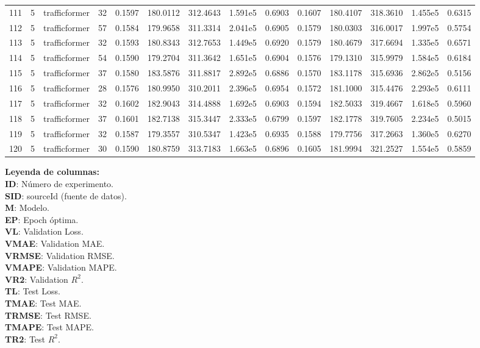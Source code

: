 \begin{landscape}
\begin{longtable}{c | c | c | c | c | c | c | c | c | c | c | c | c | c}
	111 & 5 & trafficformer & 32 & 0.1597 & 180.0112 & 312.4643 & 1.591e5 & 0.6903 & 0.1607 & 180.4107 & 318.3610 & 1.455e5 & 0.6315 \\
	112 & 5 & trafficformer & 57 & 0.1584 & 179.9658 & 311.3314 & 2.041e5 & 0.6905 & 0.1579 & 180.0303 & 316.0017 & 1.997e5 & 0.5754 \\
	113 & 5 & trafficformer & 32 & 0.1593 & 180.8343 & 312.7653 & 1.449e5 & 0.6920 & 0.1579 & 180.4679 & 317.6694 & 1.335e5 & 0.6571 \\
	114 & 5 & trafficformer & 54 & 0.1590 & 179.2704 & 311.3642 & 1.651e5 & 0.6904 & 0.1576 & 179.1310 & 315.9979 & 1.584e5 & 0.6184 \\
	115 & 5 & trafficformer & 37 & 0.1580 & 183.5876 & 311.8817 & 2.892e5 & 0.6886 & 0.1570 & 183.1178 & 315.6936 & 2.862e5 & 0.5156 \\
	116 & 5 & trafficformer & 28 & 0.1576 & 180.9950 & 310.2011 & 2.396e5 & 0.6954 & 0.1572 & 181.1000 & 315.4476 & 2.293e5 & 0.6111 \\
	117 & 5 & trafficformer & 32 & 0.1602 & 182.9043 & 314.4888 & 1.692e5 & 0.6903 & 0.1594 & 182.5033 & 319.4667 & 1.618e5 & 0.5960 \\
	118 & 5 & trafficformer & 37 & 0.1601 & 182.7138 & 315.3447 & 2.333e5 & 0.6799 & 0.1597 & 182.1778 & 319.7605 & 2.234e5 & 0.5015 \\
	119 & 5 & trafficformer & 32 & 0.1587 & 179.3557 & 310.5347 & 1.423e5 & 0.6935 & 0.1588 & 179.7756 & 317.2663 & 1.360e5 & 0.6270 \\
	120 & 5 & trafficformer & 30 & 0.1590 & 180.8759 & 313.7183 & 1.663e5 & 0.6896 & 0.1605 & 181.9994 & 321.2527 & 1.554e5 & 0.5859 \\
\end{longtable}
	
\vspace{0.5em}
\begin{minipage}{0.99\textwidth}
\footnotesize
\textbf{Leyenda de columnas:} \\
\textbf{ID}: Número de experimento. \\
\textbf{SID}: sourceId (fuente de datos). \\
\textbf{M}: Modelo. \\
\textbf{EP}: Epoch óptima. \\
\textbf{VL}: Validation Loss. \\
\textbf{VMAE}: Validation MAE. \\
\textbf{VRMSE}: Validation RMSE. \\
\textbf{VMAPE}: Validation MAPE. \\
\textbf{VR2}: Validation $R^2$. \\
\textbf{TL}: Test Loss. \\
\textbf{TMAE}: Test MAE. \\
\textbf{TRMSE}: Test RMSE. \\
\textbf{TMAPE}: Test MAPE. \\
\textbf{TR2}: Test $R^2$.\\
\end{minipage}

\end{landscape}

